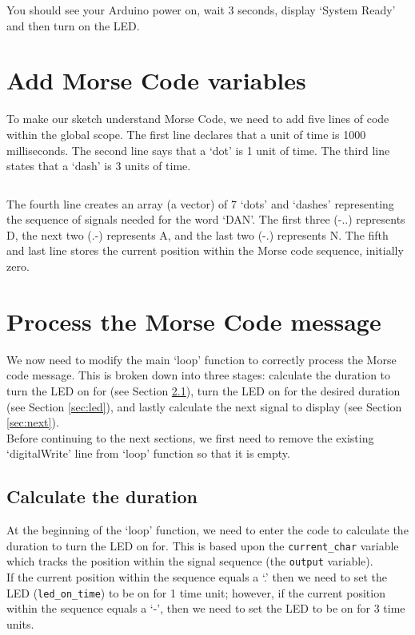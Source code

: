\documentclass[11pt,a4paper]{article}
\begin{document}
\noindent
You should see your Arduino power on, wait 3 seconds, display `System Ready' and then turn on the LED.

\section{Add Morse Code variables}
To make our sketch understand Morse Code, we need to add five lines of code within the global scope. The first line declares that a unit of time is 1000 milliseconds. The second line says that a `dot' is 1 unit of time. The third line states that a `dash' is 3 units of time.\\ 

\inputminted{arduino}{./src/2-morse-code-variables.txt}

\noindent
The fourth line creates an array (a vector) of 7 `dots' and `dashes' representing the sequence of signals needed for the word `DAN'. The first three (-..) represents D, the next two (.-) represents A, and the last two (-.) represents N. The fifth and last line stores the current position within the Morse code sequence, initially zero.

\section{Process the Morse Code message}
We now need to modify the main `loop' function to correctly process the Morse code message. This is broken down into three stages: calculate the duration to turn the LED on for (see Section \ref{sec:duration}), turn the LED on for the desired duration (see Section \ref{sec:led}), and lastly calculate the next signal to display (see Section \ref{sec:next}).\\

\noindent
Before continuing to the next sections, we first need to remove the existing `digitalWrite' line from `loop' function so that it is empty.

\subsection{Calculate the duration}
\label{sec:duration}
At the beginning of the `loop' function, we need to enter the code to calculate the duration to turn the LED on for. This is based upon the \verb|current_char| variable which tracks the position within the signal sequence (the \verb|output| variable).\\

\noindent
If the current position within the sequence equals a `.' then we need to set the LED (\verb|led_on_time|) to be on for 1 time unit; however, if the current position within the sequence equals a `-', then we need to set the LED to be on for 3 time units.
\end{document}
